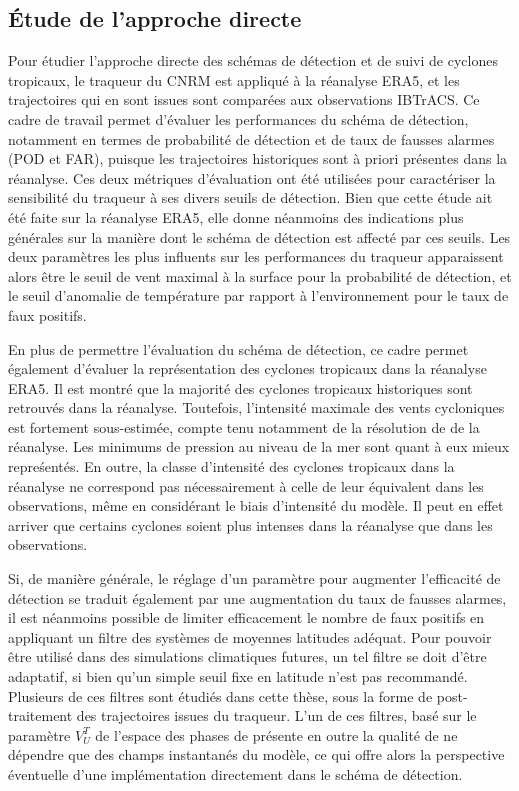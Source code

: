 \documentclass[../main.tex]{subfiles}
\begin{document}
\subsection*{Étude de l'approche directe}

Pour étudier l'approche directe des schémas de détection et de suivi de cyclones tropicaux, le traqueur du CNRM est appliqué à la réanalyse ERA5, et les
trajectoires qui en sont issues sont comparées aux observations IBTrACS. Ce cadre de travail permet d'évaluer les performances du schéma de détection, notamment
en termes de probabilité de détection et de taux de fausses alarmes (POD et FAR), puisque les trajectoires historiques sont à priori présentes dans la
réanalyse. Ces deux métriques d'évaluation ont été utilisées pour caractériser la sensibilité du traqueur à ses divers seuils de détection. Bien que cette étude
ait été faite sur la réanalyse ERA5, elle donne néanmoins des indications plus générales sur la manière dont le schéma de détection est affecté par ces seuils.
Les deux paramètres les plus influents sur les performances du traqueur apparaissent alors être le seuil de vent maximal à la surface pour la probabilité de
détection, et le seuil d'anomalie de température par rapport à l'environnement pour le taux de faux positifs.

En plus de permettre l'évaluation du schéma de détection, ce cadre permet également d'évaluer la représentation des cyclones tropicaux dans la réanalyse ERA5.
Il est montré que la majorité des cyclones tropicaux historiques sont retrouvés dans la réanalyse. Toutefois, l'intensité maximale des vents cycloniques est
fortement sous-estimée, compte tenu notamment de la résolution de  de la réanalyse. Les minimums de pression au niveau de la mer sont quant à eux mieux
repreśentés. En outre, la classe d'intensité des cyclones tropicaux dans la réanalyse ne correspond pas nécessairement à celle de leur équivalent dans les
observations, même en considérant le biais d'intensité du modèle. Il peut en effet arriver que certains cyclones soient plus intenses dans la réanalyse que dans
les observations.

Si, de manière générale, le réglage d'un paramètre pour augmenter l'efficacité de détection se traduit également par une augmentation du taux de fausses
alarmes, il est néanmoins possible de limiter efficacement le nombre de faux positifs en appliquant un filtre des systèmes de moyennes latitudes adéquat. Pour
pouvoir être utilisé dans des simulations climatiques futures, un tel filtre se doit d'être adaptatif, si bien qu'un simple seuil fixe en latitude n'est pas
recommandé. Plusieurs de ces filtres sont étudiés dans cette thèse, sous la forme de post-traitement des trajectoires issues du traqueur. L'un de ces filtres,
basé sur le paramètre $V_U^T$ de l'espace des phases de \textcite{hart_cyclone_2003} présente en outre la qualité de ne dépendre que des champs instantanés du
modèle, ce qui offre alors la perspective éventuelle d'une implémentation directement dans le schéma de détection.
\end{document}
